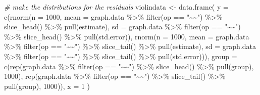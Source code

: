 \documentclass[
  man]{apa6}
\newenvironment{Shaded}{\begin{snugshade}}{\end{snugshade}}
\newcommand{\AttributeTok}[1]{\textcolor[rgb]{0.77,0.63,0.00}{#1}}
\newcommand{\CommentTok}[1]{\textcolor[rgb]{0.56,0.35,0.01}{\textit{#1}}}
\newcommand{\DecValTok}[1]{\textcolor[rgb]{0.00,0.00,0.81}{#1}}
\newcommand{\FunctionTok}[1]{\textcolor[rgb]{0.00,0.00,0.00}{#1}}
\newcommand{\NormalTok}[1]{#1}
\newcommand{\OtherTok}[1]{\textcolor[rgb]{0.56,0.35,0.01}{#1}}
\newcommand{\SpecialCharTok}[1]{\textcolor[rgb]{0.00,0.00,0.00}{#1}}
\newcommand{\StringTok}[1]{\textcolor[rgb]{0.31,0.60,0.02}{#1}}
\begin{document}
\begin{Shaded}
\begin{Highlighting}[]
  \CommentTok{\# make the distributions for the residuals }
\NormalTok{  violindata }\OtherTok{\textless{}{-}} \FunctionTok{data.frame}\NormalTok{(}
  \AttributeTok{y =} \FunctionTok{c}\NormalTok{(}\FunctionTok{rnorm}\NormalTok{(}\AttributeTok{n =} \DecValTok{1000}\NormalTok{, }
            \AttributeTok{mean =}\NormalTok{ graph.data }\SpecialCharTok{\%\textgreater{}\%} \FunctionTok{filter}\NormalTok{(op }\SpecialCharTok{==} \StringTok{"\textasciitilde{}\textasciitilde{}"}\NormalTok{) }\SpecialCharTok{\%\textgreater{}\%} 
              \FunctionTok{slice\_head}\NormalTok{() }\SpecialCharTok{\%\textgreater{}\%} \FunctionTok{pull}\NormalTok{(estimate), }
            \AttributeTok{sd =}\NormalTok{ graph.data }\SpecialCharTok{\%\textgreater{}\%} \FunctionTok{filter}\NormalTok{(op }\SpecialCharTok{==} \StringTok{"\textasciitilde{}\textasciitilde{}"}\NormalTok{) }\SpecialCharTok{\%\textgreater{}\%} 
              \FunctionTok{slice\_head}\NormalTok{() }\SpecialCharTok{\%\textgreater{}\%} \FunctionTok{pull}\NormalTok{(std.error)), }
        \FunctionTok{rnorm}\NormalTok{(}\AttributeTok{n =} \DecValTok{1000}\NormalTok{, }
            \AttributeTok{mean =}\NormalTok{ graph.data }\SpecialCharTok{\%\textgreater{}\%} \FunctionTok{filter}\NormalTok{(op }\SpecialCharTok{==} \StringTok{"\textasciitilde{}\textasciitilde{}"}\NormalTok{) }\SpecialCharTok{\%\textgreater{}\%} 
              \FunctionTok{slice\_tail}\NormalTok{() }\SpecialCharTok{\%\textgreater{}\%} \FunctionTok{pull}\NormalTok{(estimate), }
            \AttributeTok{sd =}\NormalTok{ graph.data }\SpecialCharTok{\%\textgreater{}\%} \FunctionTok{filter}\NormalTok{(op }\SpecialCharTok{==} \StringTok{"\textasciitilde{}\textasciitilde{}"}\NormalTok{) }\SpecialCharTok{\%\textgreater{}\%} 
              \FunctionTok{slice\_tail}\NormalTok{() }\SpecialCharTok{\%\textgreater{}\%} \FunctionTok{pull}\NormalTok{(std.error))),}
  \AttributeTok{group =} \FunctionTok{c}\NormalTok{(}\FunctionTok{rep}\NormalTok{(graph.data }\SpecialCharTok{\%\textgreater{}\%} \FunctionTok{filter}\NormalTok{(op }\SpecialCharTok{==} \StringTok{"\textasciitilde{}\textasciitilde{}"}\NormalTok{) }\SpecialCharTok{\%\textgreater{}\%} 
              \FunctionTok{slice\_head}\NormalTok{() }\SpecialCharTok{\%\textgreater{}\%} \FunctionTok{pull}\NormalTok{(group), }\DecValTok{1000}\NormalTok{),}
            \FunctionTok{rep}\NormalTok{(graph.data }\SpecialCharTok{\%\textgreater{}\%} \FunctionTok{filter}\NormalTok{(op }\SpecialCharTok{==} \StringTok{"\textasciitilde{}\textasciitilde{}"}\NormalTok{) }\SpecialCharTok{\%\textgreater{}\%} 
              \FunctionTok{slice\_tail}\NormalTok{() }\SpecialCharTok{\%\textgreater{}\%} \FunctionTok{pull}\NormalTok{(group), }\DecValTok{1000}\NormalTok{)), }
  \AttributeTok{x =} \DecValTok{1}
\NormalTok{  )}
  

\end{Highlighting}
\end{Shaded}
\end{document}
